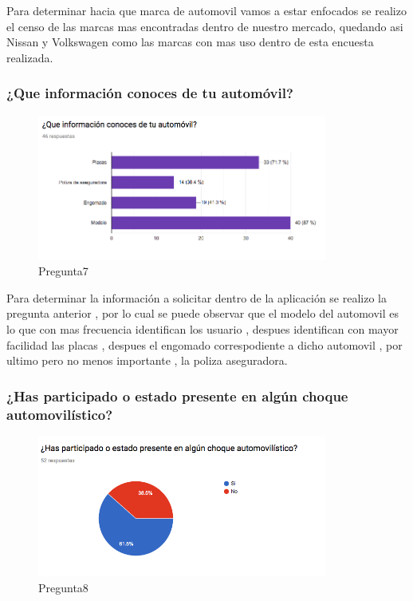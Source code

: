 Para determinar hacia que marca de automovil vamos a estar enfocados se realizo el censo de las marcas mas encontradas dentro de nuestro mercado, quedando asi  Nissan y Volkswagen como las marcas con mas uso dentro de esta encuesta realizada.\\

\subsubsection{¿Que información conoces de tu automóvil?}

\begin{figure}[htbp!]
	\begin{center}
		\includegraphics[width=0.85\textwidth]{DisenoEstructura/imagenes/Pregunta7}
		\caption{Pregunta7}
		\label{DE/FO/Pregunta7}
	\end{center}
\end{figure}

Para determinar la información a solicitar dentro de la aplicación se realizo la pregunta anterior , por lo cual se puede observar que el modelo del automovil es lo que con mas frecuencia identifican los usuario , despues identifican con mayor facilidad las placas , despues el engomado correspodiente a dicho automovil , por ultimo pero no menos importante , la poliza aseguradora.\\

\subsubsection{¿Has participado o estado presente en algún choque automovilístico?}

\begin{figure}[htbp!]
	\begin{center}
		\includegraphics[width=0.85\textwidth]{DisenoEstructura/imagenes/Pregunta8}
		\caption{Pregunta8}
		\label{DE/FO/Pregunta8}
	\end{center}
\end{figure}

